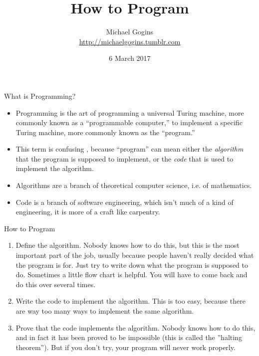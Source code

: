 \documentclass{beamer}
\title[How to Program] %
{How to Program}
\author[Gogins] %
{Michael Gogins\\
\url{http://michaelgogins.tumblr.com} 
}
\institute[Irreducible Productions] %
{
  Irreducible Productions\\
  New York
}
\date[6 March 2017] %
{6 March 2017}
\begin{document}

\begin{frame}
  \titlepage
\end{frame}

\begin{frame}{What is Programming?}
    \begin{itemize}
        \item     
            Programming is the art of programming a universal Turing machine, more commonly known as a ``programmable computer,'' to implement a specific Turing machine, more commonly known as the ``program.''
        \item
            This term is confusing , because ``program'' can mean either the \textit{algorithm} that the program is supposed to implement, or the \textit{code} that is used to implement the algorithm.
        \item
            Algorithms are a branch of theoretical computer science, i.e. of mathematics.
        \item
            Code is a branch of software engineering, which isn't much of a kind of engineering, it is more of a craft like carpentry.
            
    \end{itemize}    
\end{frame}

\begin{frame}{How to Program}
    \begin{enumerate}
        \item     
            Define the algorithm. Nobody knows how to do this, but this is the most important part of the job, usually because people haven't really decided what the program is for. Just try to write down what the program is supposed to do. Sometimes a little flow chart is helpful. You will have to come back and do this over several times.
        \item
            Write the code to implement the algorithm. This is too easy, because there are way too many ways to implement the same algorithm.
        \item
            Prove that the code implements the algorithm. Nobody knows how to do this, and in fact it has been proved to be impossible (this is called the ''halting theorem''). But if you don't try, your program will never work properly.
    \end{enumerate}    
\end{frame}
\end{document}
